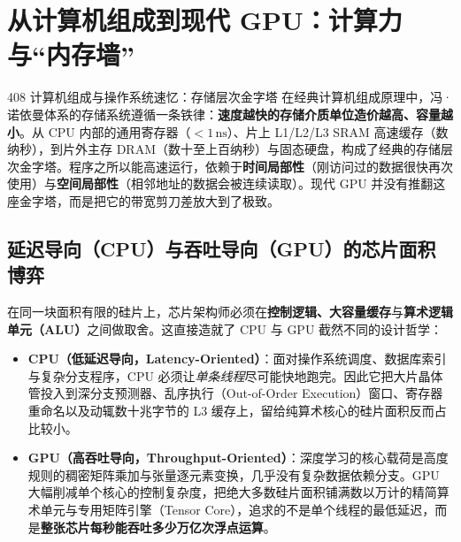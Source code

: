 \section{从计算机组成到现代 GPU：计算力与“内存墙”}
\label{sec:gpu-arch-memory-wall}

\begin{recallBox}{408 计算机组成与操作系统速忆：存储层次金字塔}
在经典计算机组成原理中，冯·诺依曼体系的存储系统遵循一条铁律：\textbf{速度越快的存储介质单位造价越高、容量越小}。从 CPU 内部的通用寄存器（$<1\,\mathrm{ns}$）、片上 L1/L2/L3 SRAM 高速缓存（数纳秒），到片外主存 DRAM（数十至上百纳秒）与固态硬盘，构成了经典的存储层次金字塔。程序之所以能高速运行，依赖于\textbf{时间局部性}（刚访问过的数据很快再次使用）与\textbf{空间局部性}（相邻地址的数据会被连续读取）。现代 GPU 并没有推翻这座金字塔，而是把它的带宽剪刀差放大到了极致。
\end{recallBox}

\subsection{延迟导向（CPU）与吞吐导向（GPU）的芯片面积博弈}

在同一块面积有限的硅片上，芯片架构师必须在\textbf{控制逻辑、大容量缓存}与\textbf{算术逻辑单元（ALU）}之间做取舍。这直接造就了 CPU 与 GPU 截然不同的设计哲学：
\begin{itemize}
  \item \textbf{CPU（低延迟导向，Latency-Oriented）}：面对操作系统调度、数据库索引与复杂分支程序，CPU 必须让\emph{单条线程}尽可能快地跑完。因此它把大片晶体管投入到深分支预测器、乱序执行（Out-of-Order Execution）窗口、寄存器重命名以及动辄数十兆字节的 L3 缓存上，留给纯算术核心的硅片面积反而占比较小。
  \item \textbf{GPU（高吞吐导向，Throughput-Oriented）}：深度学习的核心载荷是高度规则的稠密矩阵乘加与张量逐元素变换，几乎没有复杂数据依赖分支。GPU 大幅削减单个核心的控制复杂度，把绝大多数硅片面积铺满数以万计的精简算术单元与专用矩阵引擎（Tensor Core），追求的不是单个线程的最低延迟，而是\textbf{整张芯片每秒能吞吐多少万亿次浮点运算}。
\end{itemize}

